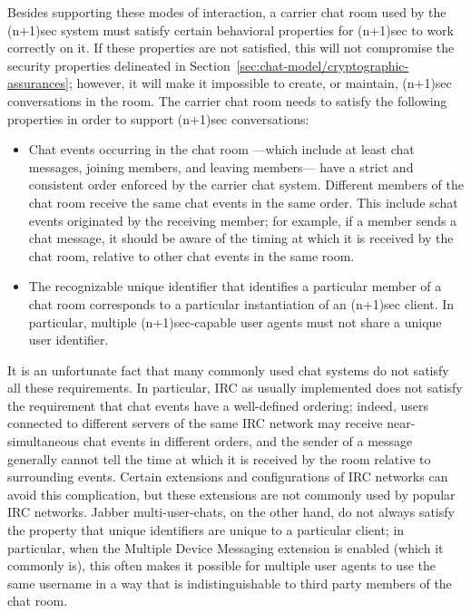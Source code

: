 \documentclass{article}
\begin{document}
Besides supporting these modes of interaction, a carrier chat room used by the (n+1)sec system must satisfy certain behavioral properties for (n+1)sec to work correctly on it.
If these properties are not satisfied, this will not compromise the security properties delineated in Section~\ref{sec:chat-model/cryptographic-assurances}; however, it will make it impossible to create, or maintain, (n+1)sec conversations in the room.
The carrier chat room needs to satisfy the following properties in order to support (n+1)sec conversations:
\begin{itemize}
\item Chat events occurring in the chat room ---which include at least chat messages, joining members, and leaving members--- have a strict and consistent order enforced by the carrier chat system. Different members of the chat room receive the same chat events in the same order. This include schat events originated by the receiving member; for example, if a member sends a chat message, it should be aware of the timing at which it is received by the chat room, relative to other chat events in the same room.
\item The recognizable unique identifier that identifies a particular member of a chat room corresponds to a particular instantiation of an (n+1)sec client. In particular, multiple (n+1)sec-capable user agents must not share a unique user identifier.
\end{itemize}

It is an unfortunate fact that many commonly used chat systems do not satisfy all these requirements.
In particular, IRC as usually implemented does not satisfy the requirement that chat events have a well-defined ordering; indeed, users connected to different servers of the same IRC network may receive near-simultaneous chat events in different orders, and the sender of a message generally cannot tell the time at which it is received by the room relative to surrounding events.
Certain extensions and configurations of IRC networks can avoid this complication, but these extensions are not commonly used by popular IRC networks.
Jabber multi-user-chats, on the other hand, do not always satisfy the property that unique identifiers are unique to a particular client; in particular, when the Multiple Device Messaging extension is enabled (which it commonly is), this often makes it possible for multiple user agents to use the same username in a way that is indistinguishable to third party members of the chat room.
\end{document}
